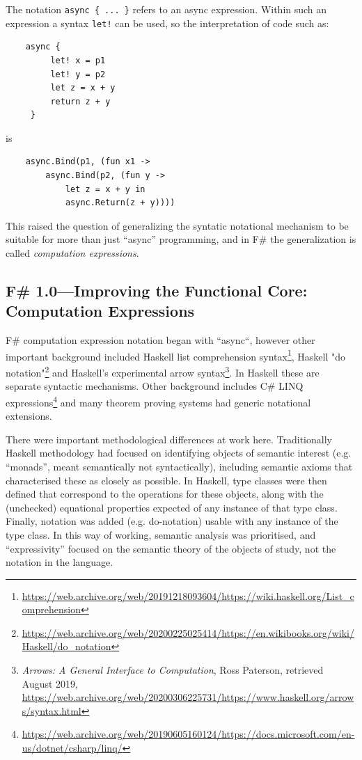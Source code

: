 \documentclass[acmsmall]{acmart}\settopmatter{}
\begin{document}
The notation \texttt{async \{ ... \}} refers to an async expression. Within such an expression a syntax \texttt{let!} can be used, so the interpretation of code such as:
\begin{verbatim}
    async { 
         let! x = p1 
         let! y = p2
         let z = x + y
         return z + y 
     }
\end{verbatim}
is
\begin{verbatim}
    async.Bind(p1, (fun x1 -> 
        async.Bind(p2, (fun y -> 
            let z = x + y in
            async.Return(z + y))))
\end{verbatim}
This raised the question of generalizing the syntatic notational mechanism to be suitable for more than just ``async'' programming, and in F\# the 
generalization is called \emph{computation expressions}.

\subsection*{F\# 1.0---Improving the Functional Core: Computation Expressions}

F\# computation expression notation began with ``async``, however other important background included Haskell list comprehension syntax\footnote{\url{https://web.archive.org/web/20191218093604/https://wiki.haskell.org/List_comprehension}}, Haskell "do notation"\footnote{\url{https://web.archive.org/web/20200225025414/https://en.wikibooks.org/wiki/Haskell/do_notation}} and Haskell's experimental
arrow syntax\footnote{\textit{Arrows: A General Interface to Computation}, Ross Paterson, retrieved August 2019, \url{https://web.archive.org/web/20200306225731/https://www.haskell.org/arrows/syntax.html}}.
In Haskell these are separate syntactic mechanisms.
Other background includes C\# LINQ expressions\footnote{\url{https://web.archive.org/web/20190605160124/https://docs.microsoft.com/en-us/dotnet/csharp/linq/}} and many
theorem proving systems had generic notational extensions.

There were important methodological differences at work here.  Traditionally Haskell methodology had focused on
identifying objects of semantic interest (e.g. ``monads'', meant semantically not syntactically), including
semantic axioms that characterised these as closely as possible. In Haskell, type classes were then defined that
correspond to the operations for these objects, along with the (unchecked) equational properties
expected of any instance of that type class. Finally, notation was added (e.g. do-notation) usable with
any instance of the type class.  In this way of working, semantic analysis was prioritised, and ``expressivity'' focused on the semantic theory of the objects of study,
not the notation in the language.
\end{document}
